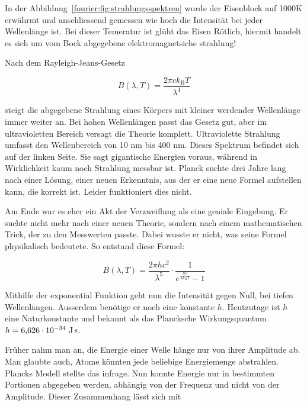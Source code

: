 	
	
	In der Abbildung~\ref{fourier:fig:strahlungsspektren} wurde der Eisenblock auf 1000K erwährmt und anschliessend gemessen wie hoch die Intensität bei jeder Wellenlänge ist.
	Bei dieser Temeratur ist glüht das Eisen Rötlich, hiermit handelt es sich um vom Bock abgegebene elektromagnetsiche strahlung!
	
	
	Nach dem Rayleigh-Jeans-Gesetz 
	
	\begin{equation}
		B(\lambda, T) = \frac{2 \pi c k_\mathrm{B} T}{\lambda^4}
	\end{equation}
	
	steigt die abgegebene Strahlung eines Körpers mit kleiner werdender Wellenlänge immer weiter an. 
	Bei hohen Wellenlängen passt das Gesetz gut, aber im ultravioletten Bereich versagt die Theorie komplett. Ultraviolette Strahlung umfasst den Wellenbereich von 10 nm bis 400 nm. 
	Dieses Spektrum befindet sich auf der linken Seite.
	Sie sagt gigantische Energien voraus, während in Wirklichkeit kaum noch Strahlung messbar ist.
	Planck suchte drei Jahre lang nach einer Lösung, einer neuen Erkenntnis, aus der er eine neue Formel aufstellen kann, die korrekt ist. 
	Leider funktioniert dies nicht.
	
	
	Am Ende war es eher ein Akt der Verzweiflung als eine geniale Eingebung. Er suchte nicht mehr nach einer neuen Theorie, sondern nach einem mathematischen Trick, der zu den Messwerten passte. 
	Dabei wusste er nicht, was seine Formel physikalisch bedeutete.
	So entstand diese Formel: 
	
	\begin{equation}
		B(\lambda, T) = \frac{2 \pi h c^2}{\lambda^5} \cdot \frac{1}{e^{\frac{h c}{\lambda k_B T}} - 1}
	\end{equation}
	
	Mithilfe der exponential Funktion geht nun die Intensität gegen Null, bei tiefen Wellenlängen. Ausserdem benötige er noch eine konstante $h$. Heutzutage ist $h$ eine Naturkonstante und bekannt als das Plancksche Wirkungsquantum $h = 6{,}626 \cdot 10^{-34} \ \text{J\,s}$. 
	


	
	
	
	Früher nahm man an, die Energie einer Welle hänge nur von ihrer Amplitude ab. 
	Man glaubte auch, Atome könnten jede beliebige Energiemenge abstrahlen. 
	Plancks Modell stellte das infrage. 
	Nun konnte Energie nur in bestimmten Portionen abgegeben werden, abhängig von der Frequenz und nicht von der Amplitude. 
	Dieser Zusammenhang lässt sich mit  
	
